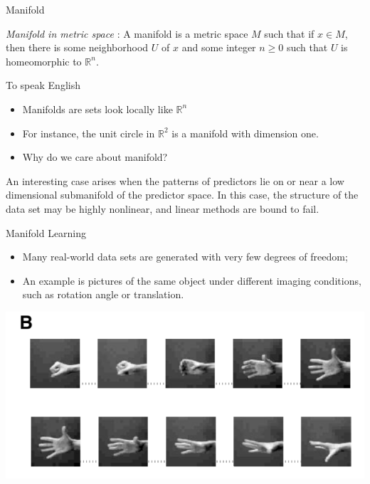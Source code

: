 \documentclass[xcolor={dvipsnames,table}]{beamer}
\begin{document}
\begin{frame}{Manifold}
	\begin{definition}{ {\em Manifold in metric space} }
		: A manifold is a metric space $M$ such that if $x \in M$, then there is some neighborhood $U$ of $x$ and some integer $n \geq 0$ such that $U$ is homeomorphic to $\mathbb{R}^n$. 
	\end{definition}
	To speak English
	\begin{itemize}
		\item Manifolds are sets look locally like $\mathbb{R}^n$
		\item For instance, the unit circle in $\mathbb{R}^2$ is a manifold with dimension one.
		\item Why do we care about manifold?
	\end{itemize}
	An interesting case arises when the patterns of predictors lie on or near a low dimensional submanifold of the predictor space. In this case, the structure of the data set may be highly nonlinear, and linear methods are bound to fail.
\end{frame}


\begin{frame}{Manifold Learning}
	\begin{itemize}
		\item Many real-world data sets are generated with very few degrees of freedom;
		\item An example is pictures of the same object under different imaging conditions, such as rotation angle or translation.
	\end{itemize}
	\includegraphics[width=\textwidth]{hand.png}
\end{frame}
\end{document}

